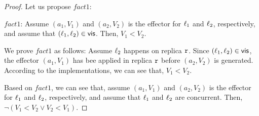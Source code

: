 \begin {proof}

Let us propose $fact1$:

\noindent $fact1$: Assume $(a_1,V_1)$ and $(a_2,V_2)$ is the effector for $\ell_1$ and $\ell_2$, respectively, and assume that $(\ell_1,\ell_2) \in \mathsf{vis}$. Then, $V_1 < V_2$.

We prove $fact1$ as follows: Assume $\ell_2$ happens on replica $\mathtt{r}$. Since $(\ell_1,\ell_2) \in \mathsf{vis}$, %
the effector $(a_1,V_1)$ has bee applied in replica $\mathtt{r}$ before $(a_2,V_2)$ is generated. According to the implementations, we can see that, $V_1 < V_2$.

Based on $fact1$, we can see that, assume $(a_1,V_1)$ and $(a_2,V_2)$ is the effector for $\ell_1$ and $\ell_2$, respectively, and assume that $\ell_1$ and $\ell_2$ are concurrent. Then, $\neg (V_1 < V_2 \vee V_2 < V_1)$.









\end{proof}
